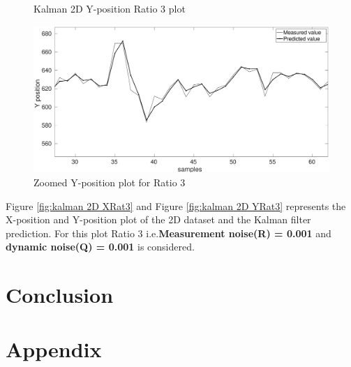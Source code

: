 \documentclass[12pt]{article}
\begin{document}
\begin{figure}[h]
\begin{minipage}{0.5\textwidth}
	\caption{Kalman 2D Y-position Ratio 3 plot }
	\label{fig:kalman 2D YRat3}
\end{minipage}%
\begin{minipage}{0.5\textwidth}
\centering
	\includegraphics[width = \textwidth]{./Figures/part2Ratio3Yzoomed.eps}
	\caption{ Zoomed Y-position plot for Ratio 3}
	\label{fig: kalman 2D YRat3 zoom}
\end{minipage}
\end{figure}
\noindent
Figure \ref{fig:kalman 2D XRat3} and Figure \ref{fig:kalman 2D YRat3} represents the X-position and Y-position plot of the 2D dataset and the Kalman filter prediction. For this plot Ratio 3 i.e.\textbf{Measurement noise(R) = 0.001} and \textbf{dynamic noise(Q) = 0.001} is considered.\\

\newpage
\section{Conclusion}






\section{Appendix}

%
%
\end{document}
